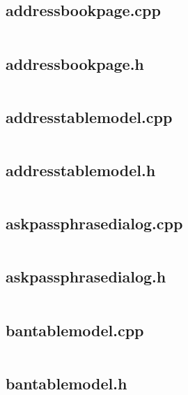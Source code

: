\documentclass{article}
\begin{document}
\subsection{addressbookpage.cpp}
\inputminted{cpp}{/home/dufferzafar/dev/@clones/bitcoin/src/qt/addressbookpage.cpp}
\newpage

\subsection{addressbookpage.h}
\inputminted{cpp}{/home/dufferzafar/dev/@clones/bitcoin/src/qt/addressbookpage.h}
\newpage

\subsection{addresstablemodel.cpp}
\inputminted{cpp}{/home/dufferzafar/dev/@clones/bitcoin/src/qt/addresstablemodel.cpp}
\newpage

\subsection{addresstablemodel.h}
\inputminted{cpp}{/home/dufferzafar/dev/@clones/bitcoin/src/qt/addresstablemodel.h}
\newpage

\subsection{askpassphrasedialog.cpp}
\inputminted{cpp}{/home/dufferzafar/dev/@clones/bitcoin/src/qt/askpassphrasedialog.cpp}
\newpage

\subsection{askpassphrasedialog.h}
\inputminted{cpp}{/home/dufferzafar/dev/@clones/bitcoin/src/qt/askpassphrasedialog.h}
\newpage

\subsection{bantablemodel.cpp}
\inputminted{cpp}{/home/dufferzafar/dev/@clones/bitcoin/src/qt/bantablemodel.cpp}
\newpage

\subsection{bantablemodel.h}
\inputminted{cpp}{/home/dufferzafar/dev/@clones/bitcoin/src/qt/bantablemodel.h}
\newpage
\end{document}
